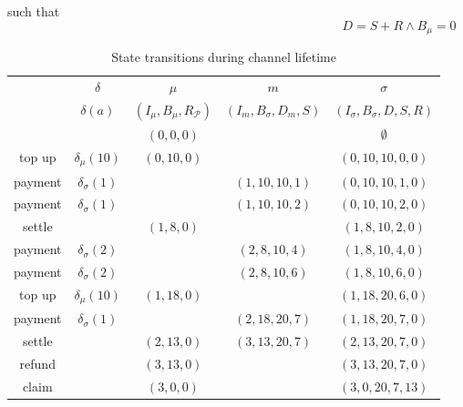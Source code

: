 \documentclass{llncs}
\begin{document}
such that
$$D = S + R \land B_\mu = 0$$

\begin{table}[t]
  \begin{tabularx}{\textwidth}{| S | S | C | C | C |}
       & $\delta$ & $\mu$ & $m$ & $\sigma$ \\ 
       & $\delta(a)$ & $(I_\mu,B_\mu,R_\mathcal{P})$ & $(I_m,B_\sigma,D_m,S)$ & $(I_\sigma,B_\sigma,D,S,R)$ \\
  \hhline{~====}
       & & $(0,0,0)$ & & $\emptyset$ \\ 
      top up  & $\delta_\mu(10)$   & $(0,10,0)$ &               & $(0,10,10,0,0)$ \\
      payment & $\delta_\sigma(1)$ &            & $(1,10,10,1)$ & $(0,10,10,1,0)$ \\
      payment & $\delta_\sigma(1)$ &            & $(1,10,10,2)$ & $(0,10,10,2,0)$ \\
      settle  &                    & $(1,8,0)$  &               & $(1,8,10,2,0)$ \\
      payment & $\delta_\sigma(2)$ &            & $(2,8,10,4)$  & $(1,8,10,4,0)$ \\
      payment & $\delta_\sigma(2)$ &            & $(2,8,10,6)$  & $(1,8,10,6,0)$ \\
      top up  & $\delta_\mu(10)$   & $(1,18,0)$ &               & $(1,18,20,6,0)$ \\
      payment & $\delta_\sigma(1)$ &            & $(2,18,20,7)$ & $(1,18,20,7,0)$ \\
      settle  &                    & $(2,13,0)$ & $(3,13,20,7)$ & $(2,13,20,7,0)$ \\
      refund  &                    & $(3,13,0)$ &               & $(3,13,20,7,0)$ \\
      claim   &                    & $(3,0,0)$  &               & $(3,0,20,7,13)$ \\
  \end{tabularx}
  \medskip
  \caption{State transitions during channel lifetime}
\end{table}
\end{document}
